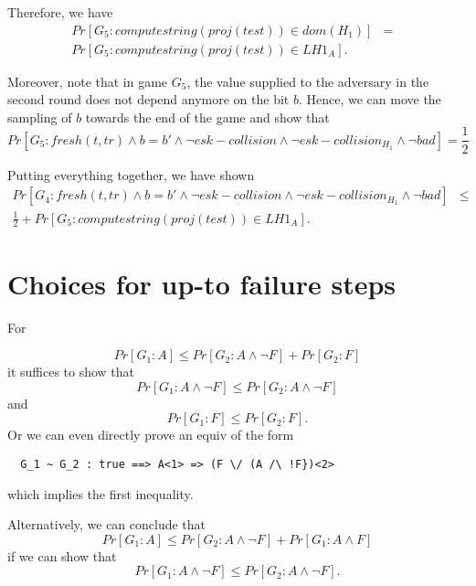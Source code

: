 \documentclass[]{article}
\begin{document}
Therefore, we have
\begin{align*}
 Pr[G_5 : computestring(proj(test)) \in dom(H_1) ]  &=& \\
 Pr[G_5 : computestring(proj(test)) \in LH1_A ].
\end{align*}

Moreover, note that in game $G_5$, the value supplied to the adversary in the second round does not depend anymore on the bit $b$. Hence, we can move the sampling of $b$ towards the end of the game and show that 
\[
  Pr[G_5 : fresh(t,tr) \land b = b' \land \neg esk-collision \land \neg esk-collision_{H_1} \land \neg bad] =
  \frac{1}{2}
\]

Putting everything together, we have shown 
\begin{align*}
  Pr[G_4 : fresh(t,tr) \land b = b' \land \neg esk-collision \land \neg esk-collision_{H_1} \land \neg bad]  &\leq&\\ 
\frac{1}{2} +  Pr[G_5 : computestring(proj(test)) \in LH1_A ].
\end{align*}

\section{Choices for up-to failure steps}

For

\[
  Pr[G_1 : A] \leq Pr[G_2 : A \land \neg F] + Pr[G_2 : F]
\]
%
it suffices to show that
\[
  Pr[G_1 : A \land \neg F] \leq Pr[G_2 : A \land \neg F]
\]
and
 \[
   Pr[G_1 : F] \leq Pr[G_2 : F].
 \]
%
Or we can even directly prove an equiv of the form
\begin{verbatim}
  G_1 ~ G_2 : true ==> A<1> => (F \/ (A /\ !F})<2>
\end{verbatim}
which implies the first inequality.

Alternatively, we can conclude that
\[
  Pr[G_1 : A] \leq Pr[G_2 : A \land \neg F] + Pr[G_1 : A \land F]
\]
%
if we can show that
\[
  Pr[G_1 : A \land \neg F] \leq Pr[G_2 : A \land \neg F].
\]
\end{document}
